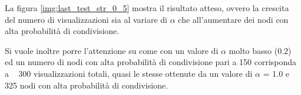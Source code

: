 La figura \ref{img:last_test_str_0_5} mostra il risultato atteso, 
ovvero la crescita del numero di visualizzazioni sia al variare di $\alpha$ che all'aumentare 
dei nodi con alta probabilità di condivisione.

Si vuole inoltre porre l'attenzione su come con un valore di $\alpha$ 
molto basso ($0.2$) ed un numero di nodi con alta probabilità di condivisione pari a 150 corrisponda 
a ~ 300 visualizzazioni totali, quasi le stesse ottenute da un valore di $\alpha$ = 1.0 e 325 nodi con 
alta probabilità di condivisione.
















